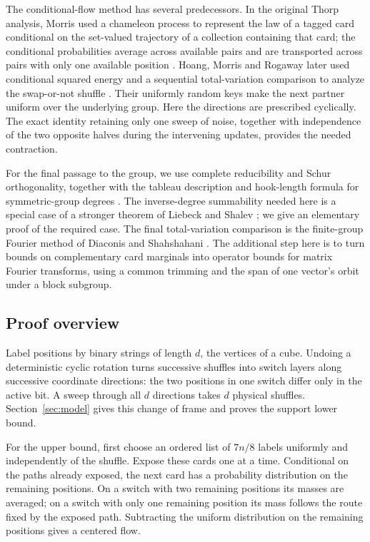 \documentclass[11pt]{article}
\theoremstyle{remark}
\numberwithin{equation}{section}
\begin{document}
The conditional-flow method has several predecessors. In the original
Thorp analysis, Morris used a chameleon process to represent the law of a tagged card
conditional on the set-valued trajectory of a collection containing
that card; the conditional probabilities average across available pairs
and are transported across pairs with only one available position
\cite[Section~4, Lemma~3]{morris44}. Hoang, Morris and Rogaway later
used conditional squared energy and a sequential total-variation
comparison to analyze the swap-or-not shuffle
\cite[Section~3, Theorem~3 and Lemma~4]{hmr2014}. Their uniformly random
keys make the next partner uniform over the underlying group.
Here the directions are prescribed cyclically. The exact identity
retaining only one sweep of noise, together with independence of the
two opposite halves during the intervening updates, provides the needed
contraction.

For the final passage to the group, we use complete reducibility and
Schur orthogonality, together with the tableau description and
hook-length formula for symmetric-group degrees
\cite{etingof,sagan}. The inverse-degree summability needed here is a
special case of a stronger theorem of Liebeck and Shalev
\cite[Theorem~2.6]{liebeck-shalev2004}; we give an elementary proof of
the required case. The final total-variation comparison is the
finite-group Fourier method of Diaconis and Shahshahani
\cite[Section~3, Lemma~14]{DiaconisShahshahani1981}.
The additional step here is to turn bounds on complementary card
marginals into operator bounds for matrix Fourier transforms, using a
common trimming and the span of one vector's orbit under a block
subgroup.

\subsection{Proof overview}

Label positions by binary strings of length $d$, the vertices of a
cube. Undoing a deterministic cyclic rotation turns successive shuffles
into switch layers along successive coordinate directions: the two
positions in one switch differ only in the active bit. A sweep through
all $d$ directions takes $d$ physical shuffles.
Section~\ref{sec:model} gives this change of frame and proves the
support lower bound.

For the upper bound, first choose an ordered list of $7n/8$ labels
uniformly and independently of the shuffle. Expose these cards one at
a time. Conditional on the paths already exposed, the next card has a
probability distribution on the remaining positions. On a switch with
two remaining positions its masses are averaged; on a switch with
only one remaining position its mass follows the route fixed by the
exposed path. Subtracting the uniform distribution on the remaining
positions gives a centered flow.
\end{document}
